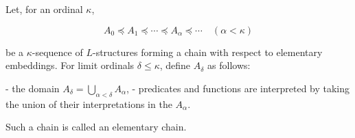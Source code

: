 Let, for an ordinal $\kappa$,

$$A_0 \preceq A_1 \preceq \cdots \preceq A_\alpha \preceq \cdots \quad (\alpha < \kappa)$$

be a $\kappa$-sequence of $L$-structures forming a chain with respect to elementary embeddings. For limit ordinals $\delta \leq \kappa$, define $A_\delta$ as follows:

- the domain $A_\delta = \bigcup_{\alpha < \delta} A_\alpha$,
- predicates and functions are interpreted by taking the union of their interpretations in the $A_\alpha$.

Such a chain is called an elementary chain.
